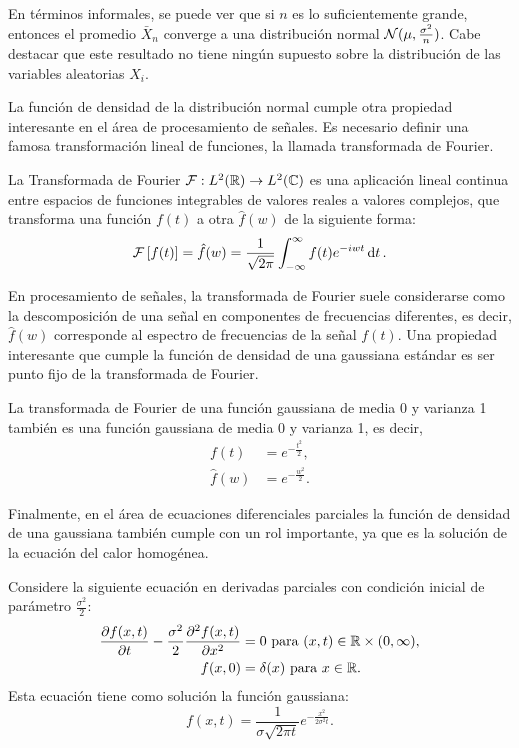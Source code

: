 En términos informales, se puede ver que si \(n\) es lo suficientemente grande, entonces el promedio \(\bar{X}_n\) converge a una distribución normal \(\mathcal{N} (\mu, \frac{\sigma^{2}}{n})\). Cabe destacar que este resultado no tiene ningún supuesto sobre la distribución de las variables aleatorias \(X_i\).

La función de densidad de la distribución normal cumple otra propiedad interesante en el área de procesamiento de señales. Es necesario definir una famosa transformación lineal de funciones, la llamada transformada de Fourier.
\begin{definition} La Transformada de Fourier \(\mathcal{F} : L^2(\mathbb{R}) \to L^2(\mathbb{C})\) es una aplicación lineal continua entre espacios de funciones integrables de valores reales a valores complejos, que transforma una función \(f(t)\) a otra \(\hat{f}(w)\) de la siguiente forma:
	\begin{equation*}
		\mathcal{F} \left[ f(t) \right] = \hat{f}(w) = \frac{1}{\sqrt{2\pi}} \int_{-\infty}^\infty f(t) e^{-iwt} \dd{t}.
	\end{equation*}
\end{definition}

En procesamiento de señales, la transformada de Fourier suele considerarse como la descomposición de una señal en componentes de frecuencias diferentes, es decir, \(\hat{f}(w)\) corresponde al espectro de frecuencias de la señal \(f(t)\). Una propiedad interesante que cumple la función de densidad de una gaussiana estándar es ser punto fijo de la transformada de Fourier.

\begin{proposition}
	La transformada de Fourier de una función gaussiana de media 0 y varianza 1 también es una función gaussiana de media 0 y varianza 1, es decir,
	\begin{align*}
		f(t)		&= e^{-\frac{t^{2}}{2}}, \\
		\hat{f}(w)	&= e^{-\frac{w^{2}}{2}}.
	\end{align*}
\end{proposition}

Finalmente, en el área de ecuaciones diferenciales parciales la función de densidad de una gaussiana también cumple con un rol importante, ya que es la solución de la ecuación del calor homogénea.

\begin{proposition}
	Considere la siguiente ecuación en derivadas parciales con condición inicial de parámetro \(\frac{\sigma^{2}}{2}\):
	\begin{align*}
		\pdv{f(x, t)}{t} - \frac{\sigma^2}{2}\pdv[2]{f(x, t)}{x}	&= 0 \text{ para } (x, t) \in \mathbb{R} \times (0, \infty), \\
		f(x, 0)														&= \delta(x) \text{ para } x \in \mathbb{R}.
	\end{align*}
	Esta ecuación tiene como solución la función gaussiana:
	\[f(x, t) = \frac{1}{\sigma \sqrt{2\pi t}} e^{-\frac{x^2}{2\sigma^2 t}}.\]
\end{proposition}

